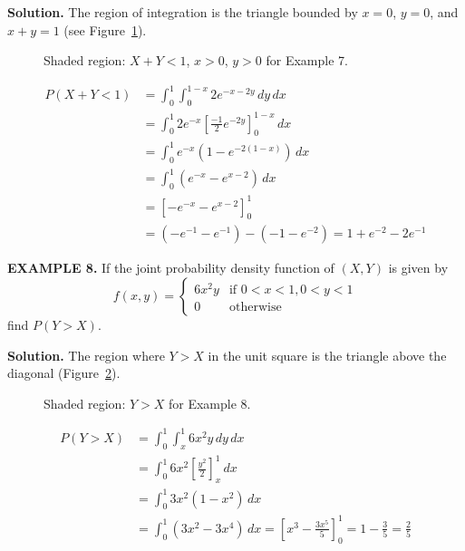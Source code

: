 \documentclass{article}
\begin{document}
\textbf{Solution.} The region of integration is the triangle bounded by $x=0$, $y=0$, and $x+y=1$ (see Figure~\ref{fig:ex7}).
\begin{figure}[H]
\centering
{}
\caption{Shaded region: $X+Y<1$, $x>0$, $y>0$ for Example 7.}
\label{fig:ex7}
\end{figure}
\begin{align*}
P(X+Y < 1) &= \int_{0}^{1} \int_{0}^{1-x} 2e^{-x-2y} \,dy \,dx \\
&= \int_{0}^{1} 2e^{-x} \left[ \frac{-1}{2} e^{-2y} \right]_{0}^{1-x} \,dx \\
&= \int_{0}^{1} e^{-x} (1 - e^{-2(1-x)}) \,dx \\
&= \int_{0}^{1} (e^{-x} - e^{x-2}) \,dx \\
&= \left[ -e^{-x} - e^{x-2} \right]_{0}^{1} \\
&= (-e^{-1} - e^{-1}) - (-1 - e^{-2}) = 1 + e^{-2} - 2e^{-1}
\end{align*}

\vspace{1em}

\textbf{EXAMPLE 8.} If the joint probability density function of $(X,Y)$ is given by
$$
f(x, y) = \begin{cases} 6x^2y & \text{if } 0 < x < 1, 0 < y < 1 \\ 0 & \text{otherwise} \end{cases}
$$
find $P(Y > X)$.

\textbf{Solution.} The region where $Y > X$ in the unit square is the triangle above the diagonal (Figure~\ref{fig:ex8}).
\begin{figure}[H]
\centering
{}
\caption{Shaded region: $Y>X$ for Example 8.}
\label{fig:ex8}
\end{figure}
\begin{align*}
P(Y > X) &= \int_{0}^{1} \int_{x}^{1} 6x^2y \,dy \,dx \\
&= \int_{0}^{1} 6x^2 \left[ \frac{y^2}{2} \right]_{x}^{1} \,dx \\
&= \int_{0}^{1} 3x^2 (1 - x^2) \,dx \\
&= \int_{0}^{1} (3x^2 - 3x^4) \,dx = \left[ x^3 - \frac{3x^5}{5} \right]_{0}^{1} = 1 - \frac{3}{5} = \frac{2}{5}
\end{align*}
\end{document}
